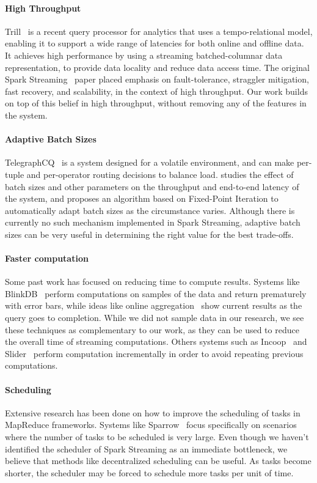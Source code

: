 \paragraph {\bf High Throughput} Trill~\cite{Trill} is a recent query processor for analytics that uses a tempo-relational model, enabling it to support a wide range of latencies for both online and offline data. It achieves high performance by using a streaming batched-columnar data representation, to provide data locality and reduce data access time.
The original Spark Streaming~\cite{SparkStreaming} paper placed emphasis on fault-tolerance, straggler mitigation, fast recovery, and scalability, in the context of high throughput. Our work builds on top of this belief in high throughput, without removing any of the features in the system.

\paragraph {\bf Adaptive Batch Sizes} TelegraphCQ~\cite{TelegraphCQ} is a system designed for a volatile environment, and can make per-tuple and per-operator routing decisions to balance load. \cite{das2014adaptive} studies the effect of batch sizes and other parameters on the throughput and end-to-end latency of the system, and proposes an algorithm based on Fixed-Point Iteration to automatically adapt batch sizes as the circumstance varies. Although there is currently no such mechanism implemented in Spark Streaming, adaptive batch sizes can be very useful in determining the right value for the best trade-offs.

\paragraph {\bf Faster computation} Some past work has focused on reducing time to compute results. Systems like BlinkDB~\cite{BlinkDB} perform computations on samples of the data and return prematurely with error bars, while ideas like online aggregation~\cite{OnlineAggregation} show current results as the query goes to completion.
While we did not sample data in our research, we see these techniques as complementary to our work, as they can be used to reduce the overall time of streaming computations.
Others systems such as Incoop~\cite{Incoop} and Slider~\cite{Slider} perform computation incrementally in order to avoid repeating previous computations. 

\paragraph {\bf Scheduling} Extensive research has been done on how to improve the scheduling of tasks in MapReduce frameworks. 
Systems like Sparrow~\cite{Sparrow} focus specifically on scenarios where the number of tasks to be scheduled is very large.
Even though we haven't identified the scheduler of Spark Streaming as an immediate bottleneck, we believe that methods like decentralized scheduling can be useful. As tasks become shorter, the scheduler may be forced to schedule more tasks per unit of time. 

